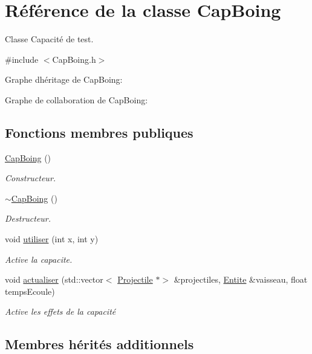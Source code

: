 \hypertarget{class_cap_boing}{}\section{Référence de la classe Cap\+Boing}
\label{class_cap_boing}


Classe Capacité de test.  




{\ttfamily \#include $<$Cap\+Boing.\+h$>$}



Graphe d\textquotesingle{}héritage de Cap\+Boing\+:


Graphe de collaboration de Cap\+Boing\+:
\subsection*{Fonctions membres publiques}
\begin{DoxyCompactItemize}
\item 
\hyperlink{class_cap_boing_a56cc994661e49acc90ba77ac7380960d}{Cap\+Boing} ()
\begin{DoxyCompactList}\small\item\em Constructeur. \end{DoxyCompactList}\item 
\hyperlink{class_cap_boing_a973a224dd449164c8840d8f8e86a10ff}{$\sim$\+Cap\+Boing} ()
\begin{DoxyCompactList}\small\item\em Destructeur. \end{DoxyCompactList}\item 
void \hyperlink{class_cap_boing_af68b4064c3a6dafd10adbd63c2f27547}{utiliser} (int x, int y)
\begin{DoxyCompactList}\small\item\em Active la capacite. \end{DoxyCompactList}\item 
void \hyperlink{class_cap_boing_a3d7900fcfc45344f7b584efb7f8c81b6}{actualiser} (std\+::vector$<$ \hyperlink{class_projectile}{Projectile} $\ast$$>$ \&projectiles, \hyperlink{class_entite}{Entite} \&vaisseau, float temps\+Ecoule)
\begin{DoxyCompactList}\small\item\em Active les effets de la capacité \end{DoxyCompactList}\end{DoxyCompactItemize}
\subsection*{Membres hérités additionnels}


